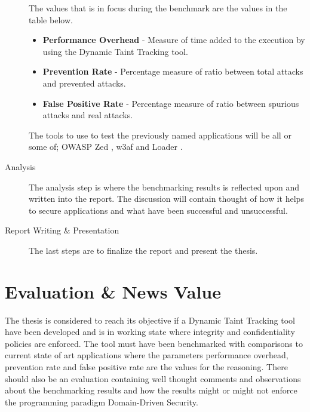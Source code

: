 \documentclass{../kththesis}
\begin{document}
\begin{description}
		The values that is in focus during the benchmark are the values in the table below. 
		
		\begin{itemize}  
			\item \textbf{Performance Overhead} - Measure of time added to the execution by using the Dynamic Taint Tracking tool.
			\item \textbf{Prevention Rate} - Percentage measure of ratio between total attacks and prevented attacks.
			\item \textbf{False Positive Rate} - Percentage measure of ratio between spurious attacks and real attacks.
		\end{itemize}
	
		The tools to use to test the previously named applications will be all or some of; OWASP Zed \parencite{zed}, w3af \parencite{w3af} and Loader \parencite{loader}.
	
		\item [Analysis]
		The analysis step is where the benchmarking results is reflected upon and written into the report. The discussion will contain thought of how it helps to secure applications and what have been successful and unsuccessful.
	
		\item [Report Writing \& Presentation]
		The last steps are to finalize the report and present the thesis.
	\end{description}
	
	
	
	\chapter{Evaluation \& News Value}
	The thesis is considered to reach its objective if a Dynamic Taint Tracking tool have been developed and is in working state where integrity and confidentiality policies are enforced. The tool must have been benchmarked with comparisons to current state of art applications where the parameters performance overhead, prevention rate and false positive rate are the values for the reasoning. There should also be an evaluation containing well thought comments and observations about the benchmarking results and how the results might or might not enforce the programming paradigm Domain-Driven Security.
	
\end{document}
